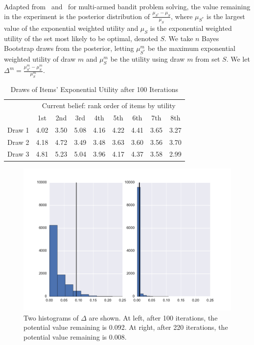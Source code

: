 \documentclass[a4paper,11pt]{article}
\begin{document}
Adapted from~\cite{scott2015multi} and~\cite{scott2010modern} for multi-armed bandit problem solving, the value remaining in the experiment is the posterior distribution of $\frac{\mu_{S^*}-\mu_{S}}{\mu_{S}}$, where $\mu_{S^*}$ is the largest value of the exponential weighted utility and $\mu_{S}$ is the exponential weighted utility of the set most likely to be optimal, denoted $S$. We take $n$ Bayes Bootstrap draws from the posterior, letting $\mu_{S^*}^{m}$ be the maximum exponential weighted utility of draw $m$ and $\mu_{S}^{m}$ be the utility using draw $m$ from set $S$. We let $\Delta^{m}=\frac{\mu^m_{S^*}-\mu^m_{S}}{\mu^m_{S}}$.

\begin{table}
\begin{center}
\caption{Draws of Items' Exponential Utility after 100 Iterations}
\label{table:data}
\begin{tabular}{l | c c c c c c c c}
& \multicolumn{8}{c}{Current belief: rank order of items by utility} \\
& 1st &  2nd  &  3rd  &  4th &  5th & 6th & 7th &  8th \\
\hline
Draw 1 & 4.02 &  3.50 &  5.08 & 4.16&  4.22 & 4.41 & 3.65 &  3.27 \\
Draw 2 &4.18 & 4.72 & 3.49 & 3.48 & 3.63 & 3.60 & 3.56 &  3.70 \\
Draw 3 &4.81 & 5.23 & 5.04 &  3.96 &  4.17 & 4.37 &  3.58 & 2.99 \\ 
\end{tabular}
\end{center}
\end{table}

\begin{figure}
\includegraphics[width=1\linewidth]{plots/valremhist.pdf}
\caption{Two histograms of $\Delta$ are shown. At left, after 100 iterations, the potential value remaining is 0.092. At right, after 220 iterations, the potential value remaining is 0.008.}
\label{fig:data}
\end{figure}
\end{document}
